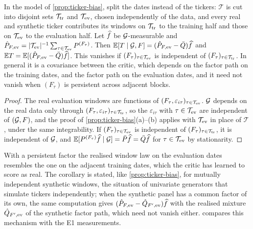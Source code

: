 \begin{corollary}\label{cor:block-bias}
In the model of \cref{prop:ticker-bias}, split the dates instead of the tickers: $\mathcal T$ is
cut into disjoint sets $\mathcal T_{\mathrm{tr}}$ and $\mathcal T_{\mathrm{ev}}$, chosen independently of the
data, and every real and synthetic ticker contributes its windows on $\mathcal T_{\mathrm{tr}}$ to the
training half and those on $\mathcal T_{\mathrm{ev}}$ to the evaluation half. Let $\widehat{f}$ be
$\mathcal{G}$-measurable and $\hat P_{F,\mathrm{ev}}=\lvert\mathcal T_{\mathrm{ev}}\rvert^{-1}\sum_{\tau\in\mathcal
T_{\mathrm{ev}}}P^{(F_\tau)}$. Then $\mathbb{E}[T\mid\mathcal{G},F]=(\hat P_{F,\mathrm{ev}}-\bar Q)\widehat{f}$ and
$\mathbb{E} T=\mathbb{E}[(\hat P_{F,\mathrm{ev}}-\bar Q)\widehat{f}]$. This vanishes if $(F_\tau)_{\tau\in\mathcal T_{\mathrm{ev}}}$ is
independent of $(F_\tau)_{\tau\in\mathcal T_{\mathrm{tr}}}$. In general it is a covariance between the
critic, which depends on the factor path on the training dates, and the factor path on the
evaluation dates, and it need not vanish when $(F_\tau)$ is persistent across adjacent blocks.
\end{corollary}
\begin{proof}
The real evaluation windows are functions of $(F_\tau,\varepsilon_{i\tau})_{\tau\in\mathcal
T_{\mathrm{ev}}}$. $\mathcal{G}$ depends on the real data only through $(F_\tau,\varepsilon_{i\tau})_{\tau\in
\mathcal T_{\mathrm{tr}}}$, so the $\varepsilon_{i\tau}$ with $\tau\in\mathcal T_{\mathrm{ev}}$ are independent of
$(\mathcal{G},F)$, and the proof of \cref{prop:ticker-bias}(a)--(b) applies with $\mathcal T_{\mathrm{ev}}$ in
place of $\mathcal T$, under the same integrability. If $(F_\tau)_{\tau\in\mathcal T_{\mathrm{ev}}}$ is
independent of $(F_\tau)_{\tau\in\mathcal T_{\mathrm{tr}}}$, it is independent of $\mathcal{G}$, and
$\mathbb{E}[P^{(F_\tau)}\widehat{f}\mid\mathcal{G}]=\bar P\widehat{f}=\bar Q\widehat{f}$ for $\tau\in\mathcal T_{\mathrm{ev}}$ by
stationarity.
\end{proof}

With a persistent factor the realised window law on the evaluation dates resembles the one on the
adjacent training dates, which the critic has learned to score as real. The corollary is stated,
like \cref{prop:ticker-bias}, for mutually independent synthetic windows, the situation of
univariate generators that simulate tickers independently; when the synthetic panel has a common
factor of its own, the same computation gives $(\hat P_{F,\mathrm{ev}}-\hat Q_{F',\mathrm{ev}})\widehat{f}$ with the
realised mixture $\hat Q_{F',\mathrm{ev}}$ of the synthetic factor path, which need not vanish either.
 compares this mechanism with the E1 measurements.

